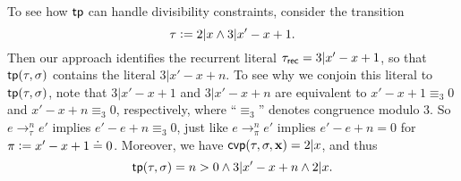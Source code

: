 \begin{example}[Divisibility]
  To see how $\mathsf{tp}$ can handle divisibility constraints, consider the transition
  \[
    \tau \mathrel{\mathop:}= 2|x \land 3|x' - x + 1.
  \]
  Then our approach identifies the recurrent literal $\tau_{\mathsf{rec}} = 3|x' - x + 1$, so that $\mathsf{tp}(\tau,\sigma)$ contains the literal $3|x' - x + n$.
  To see why we conjoin this literal to $\mathsf{tp}(\tau,\sigma)$, note that $3|x'-x+1$ and
  $3|x'-x+n$ are equivalent to $x'-x + 1 \equiv_3 0$ and $x'-x + n \equiv_3 0$, respectively, where ``$\equiv_3$'' denotes congruence modulo $3$.
  So $e \to^n_{\tau} e'$ implies $e'-e+n \equiv_3 0$, just like $e \to^n_{\pi} e'$ implies
  $e'-e+n=0$ for $\pi \mathrel{\mathop:}= x'-x+1 \doteq 0$.
  Moreover, we have $\mathsf{cvp}(\tau,\sigma,\bm{\mathrm{x}}) = 2|x$, and thus
  \[
    \mathsf{tp}(\tau,\sigma) = n>0 \land 3|x'-x+n \land 2|x.
  \]
\end{example}

